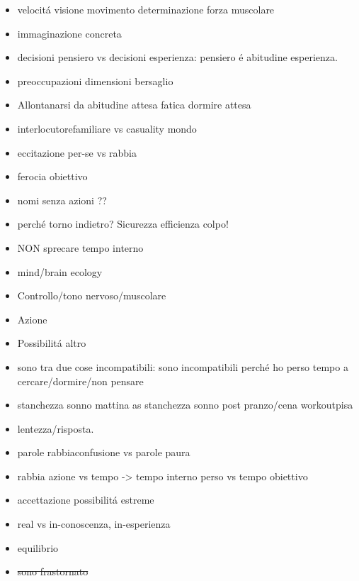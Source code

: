 \begin{itemize}

\item velocit\'a visione  movimento determinazione forza muscolare 

\item immaginazione concreta 

\item decisioni pensiero vs decisioni esperienza: pensiero \'e abitudine esperienza.

\item preoccupazioni dimensioni bersaglio

\item Allontanarsi da abitudine attesa fatica dormire attesa

\item interlocutorefamiliare vs casuality mondo

\item eccitazione per-se vs rabbia

\item ferocia obiettivo

\item nomi senza azioni ??

\item perch\'e torno indietro? Sicurezza efficienza colpo!

\item NON sprecare tempo interno

\item mind/brain ecology

\item Controllo/tono nervoso/muscolare

\item Azione

\item Possibilit\'a altro

\item sono  tra due cose incompatibili: sono incompatibili perch\'e ho perso tempo a cercare/dormire/non pensare

\item stanchezza sonno mattina as stanchezza sonno post pranzo/cena workoutpisa

\item lentezza/risposta.

\item parole rabbiaconfusione vs parole paura

\item rabbia azione vs tempo -> tempo interno perso vs tempo obiettivo

\item accettazione possibilit\'a estreme

\item real vs in-conoscenza, in-esperienza

\item equilibrio

\item \sout{sono frastornato}

\end{itemize}


